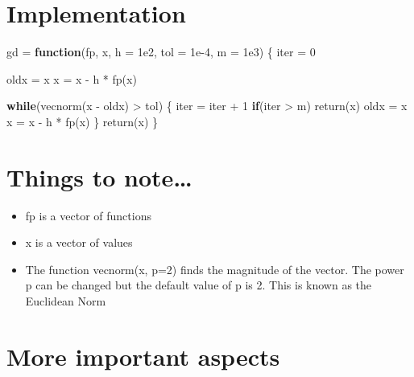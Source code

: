 \documentclass[
]{article}
\newenvironment{Shaded}{\begin{snugshade}}{\end{snugshade}}
\newcommand{\AttributeTok}[1]{\textcolor[rgb]{0.77,0.63,0.00}{#1}}
\newcommand{\ControlFlowTok}[1]{\textcolor[rgb]{0.13,0.29,0.53}{\textbf{#1}}}
\newcommand{\DecValTok}[1]{\textcolor[rgb]{0.00,0.00,0.81}{#1}}
\newcommand{\FloatTok}[1]{\textcolor[rgb]{0.00,0.00,0.81}{#1}}
\newcommand{\FunctionTok}[1]{\textcolor[rgb]{0.00,0.00,0.00}{#1}}
\newcommand{\NormalTok}[1]{#1}
\newcommand{\OtherTok}[1]{\textcolor[rgb]{0.56,0.35,0.01}{#1}}
\newcommand{\SpecialCharTok}[1]{\textcolor[rgb]{0.00,0.00,0.00}{#1}}
\providecommand{\tightlist}{%
  \setlength{\itemsep}{0pt}\setlength{\parskip}{0pt}}
\begin{document}
\hypertarget{implementation}{%
\section{Implementation}\label{implementation}}

\begin{Shaded}
\begin{Highlighting}[]
\NormalTok{gd }\OtherTok{=} \ControlFlowTok{function}\NormalTok{(fp, x, }\AttributeTok{h =} \FloatTok{1e2}\NormalTok{, }\AttributeTok{tol =} \FloatTok{1e{-}4}\NormalTok{, }\AttributeTok{m =} \FloatTok{1e3}\NormalTok{)}
\NormalTok{\{}
\NormalTok{  iter }\OtherTok{=} \DecValTok{0}
  
\NormalTok{  oldx }\OtherTok{=}\NormalTok{ x}
\NormalTok{  x }\OtherTok{=}\NormalTok{ x }\SpecialCharTok{{-}}\NormalTok{ h }\SpecialCharTok{*} \FunctionTok{fp}\NormalTok{(x)}
  
  \ControlFlowTok{while}\NormalTok{(}\FunctionTok{vecnorm}\NormalTok{(x }\SpecialCharTok{{-}}\NormalTok{ oldx) }\SpecialCharTok{\textgreater{}}\NormalTok{ tol)}
\NormalTok{  \{}
\NormalTok{    iter }\OtherTok{=}\NormalTok{ iter }\SpecialCharTok{+} \DecValTok{1}
    \ControlFlowTok{if}\NormalTok{(iter }\SpecialCharTok{\textgreater{}}\NormalTok{ m)}
      \FunctionTok{return}\NormalTok{(x)}
\NormalTok{    oldx }\OtherTok{=}\NormalTok{ x}
\NormalTok{    x }\OtherTok{=}\NormalTok{ x }\SpecialCharTok{{-}}\NormalTok{ h }\SpecialCharTok{*} \FunctionTok{fp}\NormalTok{(x)}
\NormalTok{  \}}
  \FunctionTok{return}\NormalTok{(x)}
\NormalTok{\}}
\end{Highlighting}
\end{Shaded}

\hypertarget{things-to-note}{%
\section{Things to note\ldots{}}\label{things-to-note}}

\begin{itemize}
\tightlist
\item
  fp is a vector of functions
\item
  x is a vector of values
\item
  The function vecnorm(x, p=2) finds the magnitude of the vector. The
  power p can be changed but the default value of p is 2. This is known
  as the Euclidean Norm
\end{itemize}

\hypertarget{more-important-aspects}{%
\section{More important aspects}\label{more-important-aspects}}
\end{document}
